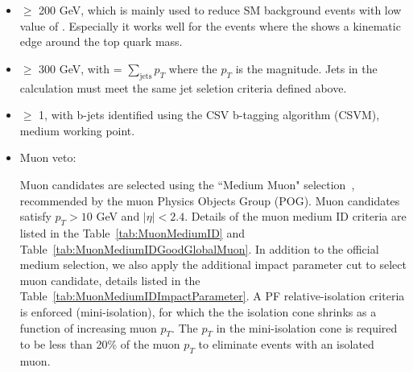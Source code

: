 \begin{itemize}
\item \MTTwo $\ge$ 200 GeV, which is mainly used to reduce SM background events with low value of \MTTwo. Especially it works well for the 
\ttbar events where the \MTTwo shows a kinematic edge around the top quark mass.

\item \HT $\ge$ 300 GeV, with \HT = $\sum_{\mathrm{jets}} p_{T}$ where the $p_{T}$ is the magnitude.
Jets in the \HT calculation must meet the same jet seletion criteria defined above.

\item \nbjets $\ge$ 1, with b-jets identified using the CSV b-tagging algorithm 
(CSVM), medium working point.

\item Muon veto:

Muon candidates are selected using the ``Medium Muon" selection~\cite{POGmuon},
recommended by the muon Physics Objects Group (POG).
Muon candidates satisfy $p_{T}>10$ GeV and $|\eta|<2.4$.
Details of the muon medium ID criteria are listed in the Table~\ref{tab:MuonMediumID} and Table~\ref{tab:MuonMediumIDGoodGlobalMuon}.
In addition to the official medium selection, we also apply the additional impact parameter cut to select muon candidate, details listed in the Table~\ref{tab:MuonMediumIDImpactParameter}.
A PF relative-isolation criteria is enforced (mini-isolation), for which the
the isolation cone shrinks as a function of increasing muon $p_{T}$. The $p_{T}$ 
in the mini-isolation cone is required to be less than 20\% of the 
muon $p_{T}$ to eliminate events with an isolated muon. 

\newsavebox{\closureBox}


\end{itemize}
